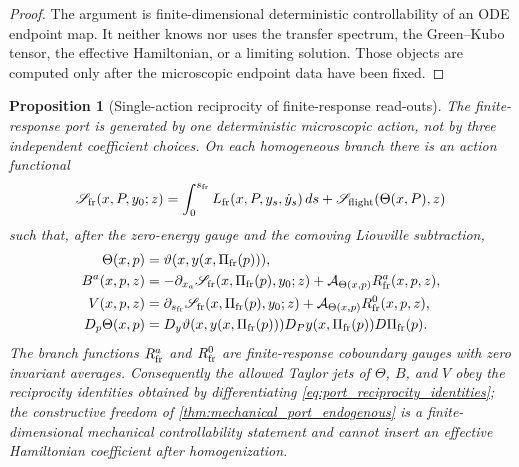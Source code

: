 \documentclass[12pt, letterpaper]{amsart}
\newcommand{\Acal}{\mathcal{A}}
\newcommand{\Pifr}{\Pi_{\mathrm{fr}}}
\theoremstyle{plain}
\newtheorem{proposition}[theorem]{Proposition}
\theoremstyle{definition}
\theoremstyle{remark}
\begin{document}
\begin{proof}
The argument is finite-dimensional deterministic controllability of an ODE
endpoint map.  It neither knows nor uses the transfer spectrum, the Green--Kubo
tensor, the effective Hamiltonian, or a limiting solution.  Those objects are
computed only after the microscopic endpoint data have been fixed.
\end{proof}



\begin{proposition}[Single-action reciprocity of finite-response read-outs]
\label{prop:single_action_reciprocity_port}
The finite-response port is generated by one deterministic microscopic action,
not by three independent coefficient choices.  On each homogeneous branch there
is an action functional
\begin{equation}
\label{eq:finite_response_generating_action}
    \mathscr S_{\rm fr}(x,P,y_0;z)
       =\int_0^{s_{\rm fr}}L_{\rm fr}(x,P,y_s,\dot y_s)\,ds
        +\mathscr S_{\rm flight}(\Theta(x,P),z)
\end{equation}
such that, after the zero-energy gauge and the comoving Liouville subtraction,
\begin{align}
\label{eq:port_reciprocity_identities}
    \Theta(x,p)&=\vartheta(x,y(x,\Pifr(p))),\\
    B^a(x,p,z)&=-\partial_{x_a}\mathscr S_{\rm fr}(x,\Pifr(p),y_0;z)
        +\Acal_{\Theta(x,p)}R^a_{\rm fr}(x,p,z),\\
    V(x,p,z)&=\partial_{s_{\rm fr}}\mathscr S_{\rm fr}(x,\Pifr(p),y_0;z)
        +\Acal_{\Theta(x,p)}R^0_{\rm fr}(x,p,z),\\
    D_p\Theta(x,p)&=D_y\vartheta(x,y(x,\Pifr(p)))
        D_Py(x,\Pifr(p))D\Pifr(p).
\end{align}
The branch functions $R^a_{\rm fr}$ and $R^0_{\rm fr}$ are finite-response
coboundary gauges with zero invariant averages.  Consequently the allowed
Taylor jets of $\Theta$, $B$, and $V$ obey the reciprocity identities obtained
by differentiating \eqref{eq:port_reciprocity_identities}; the constructive
freedom of \cref{thm:mechanical_port_endogenous} is a finite-dimensional
mechanical controllability statement and cannot insert an effective Hamiltonian
coefficient after homogenization.
\end{proposition}
\end{document}
